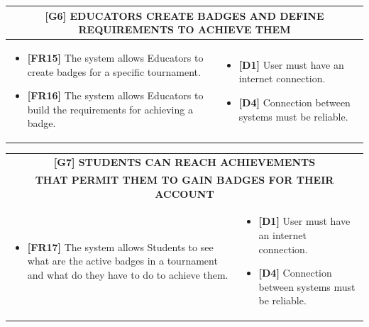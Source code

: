 \documentclass{article}
\begin{document}
\begin{table}
\begin{adjustwidth}{-1in}{-1in}
 \renewcommand{\arraystretch}{1.5}
    \begin{tabular}{|p{9.5cm}|p{9.5cm}|}
        \hline
        \multicolumn{2}{|c|}{\textbf{[G6] EDUCATORS CREATE BADGES AND DEFINE REQUIREMENTS TO ACHIEVE THEM}} \\
        \hline
        \begin{itemize}[label={}, left=0pt, align=left, itemsep=5pt]
            \item \textbf{[FR15]} The system allows Educators to create badges for a specific tournament.
            \item \textbf{[FR16]} The system allows Educators to build the requirements for achieving a badge.
        \end{itemize} &
        \begin{itemize}[label={}, left=0pt, align=left, itemsep=5pt]
            \item \textbf{[D1]} User must have an internet connection.
            \item \textbf{[D4]} Connection between systems must be reliable.
        \end{itemize} \\
        \hline
    \end{tabular}
\end{adjustwidth}
\end{table}

\begin{table}
\begin{adjustwidth}{-1in}{-1in}
 \renewcommand{\arraystretch}{1.5}
    \begin{tabular}{|p{9.5cm}|p{9.5cm}|}
        \hline
        \multicolumn{2}{|c|}{\textbf{[G7] STUDENTS CAN REACH ACHIEVEMENTS}} \\
        \multicolumn{2}{|c|}{\textbf{THAT PERMIT THEM TO GAIN BADGES FOR THEIR ACCOUNT}} \\
        \hline
        \begin{itemize}[label={}, left=0pt, align=left, itemsep=5pt]
            \item \textbf{[FR17]} The system allows Students to see what are the active badges in a tournament and what do they have to do to achieve them.
        \end{itemize} &
        \begin{itemize}[label={}, left=0pt, align=left, itemsep=5pt]
            \item \textbf{[D1]} User must have an internet connection.
            \item \textbf{[D4]} Connection between systems must be reliable.
        \end{itemize} \\
        \hline
    \end{tabular}
\end{adjustwidth}
\end{table}
\end{document}
